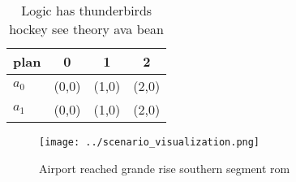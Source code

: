 \documentclass[a4paper]{article}
\begin{document}
\begin{table}
\begin{adjustbox}{width=0.5\columnwidth}
\begin{tabular}{|l|l|l|l|}
\hline
\textbf{plan} & \multicolumn{1}{c|}{\textbf{0}} & \multicolumn{1}{c|}{\textbf{1}} & \multicolumn{1}{c|}{\textbf{2}} \\ \hline
\textbf{$a_0$}  & (0,0) & (1,0) & (2,0) \\ \hline
\textbf{$a_1$}  & (0,0) & (1,0) & (2,0) \\ \hline
\end{tabular}
\end{adjustbox}
\caption{Logic has thunderbirds hockey see theory ava bean
}
\end{table}

\begin{figure}
\centering
\texttt{[image: ../scenario\_visualization.png]}
\caption{Airport reached grande rise southern segment rom 
}
\end{figure}
 
\end{document}
